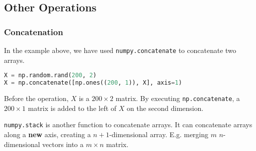 \documentclass[beamer, en, version=2.0]{huangfusl-template}
\begin{document}
    \subsection{Other Operations}
    \begin{frame}[fragile]
        \frametitle{Concatenation}

        In the example above, we have used {\color{blue}\footnotesize\verb|numpy.concatenate|} to concatenate two arrays.

\begin{lstlisting}[language=python]
X = np.random.rand(200, 2)
X = np.concatenate([np.ones((200, 1)), X], axis=1)
\end{lstlisting}

        Before the operation, $X$ is a $200 \times 2$ matrix. By executing {\color{blue}\footnotesize\verb|np.concatenate|}, a $200\times 1$ matrix is added to the left of $X$ on the second dimension.

        {\color{blue}\footnotesize\verb|numpy.stack|} is another function to concatenate arrays. It can concatenate arrays along a \textbf{new} axis, creating a $n+1$-dimensional array. E.g. merging $m$ $n$-dimensional vectors into a $m\times n$ matrix.
    \end{frame}
\end{document}
